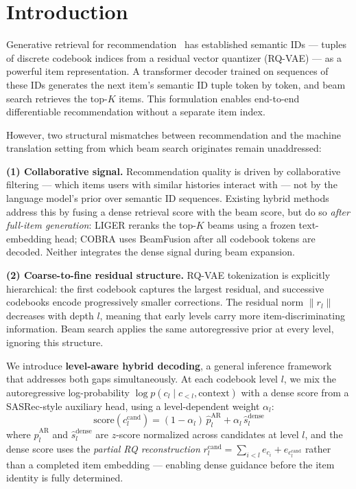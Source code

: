 \section{Introduction}
\label{sec:intro}

Generative retrieval for recommendation~\cite{rajput2023tiger} has established semantic IDs — tuples of discrete codebook indices from a residual vector quantizer (RQ-VAE) — as a powerful item representation. A transformer decoder trained on sequences of these IDs generates the next item's semantic ID tuple token by token, and beam search retrieves the top-$K$ items. This formulation enables end-to-end differentiable recommendation without a separate item index.

However, two structural mismatches between recommendation and the machine translation setting from which beam search originates remain unaddressed:

\textbf{(1) Collaborative signal.} Recommendation quality is driven by collaborative filtering — which items users with similar histories interact with — not by the language model's prior over semantic ID sequences. Existing hybrid methods~\cite{yang2024liger, yang2025cobra} address this by fusing a dense retrieval score with the beam score, but do so \emph{after full-item generation}: LIGER reranks the top-$K$ beams using a frozen text-embedding head; COBRA uses BeamFusion after all codebook tokens are decoded. Neither integrates the dense signal during beam expansion.

\textbf{(2) Coarse-to-fine residual structure.} RQ-VAE tokenization is explicitly hierarchical: the first codebook captures the largest residual, and successive codebooks encode progressively smaller corrections. The residual norm $\|r_l\|$ decreases with depth $l$, meaning that early levels carry more item-discriminating information. Beam search applies the same autoregressive prior at every level, ignoring this structure.

We introduce \textbf{level-aware hybrid decoding}, a general inference framework that addresses both gaps simultaneously. At each codebook level $l$, we mix the autoregressive log-probability $\log p(c_l \mid c_{<l}, \text{context})$ with a dense score from a SASRec-style auxiliary head, using a level-dependent weight $\alpha_l$:
%
\begin{equation}
  \text{score}(c_l^{\text{cand}}) = (1 - \alpha_l)\,\hat{p}_l^{\text{AR}} + \alpha_l\,\hat{s}_l^{\text{dense}}
  \label{eq:mixing}
\end{equation}
%
where $\hat{p}_l^{\text{AR}}$ and $\hat{s}_l^{\text{dense}}$ are $z$-score normalized across candidates at level $l$, and the dense score uses the \emph{partial RQ reconstruction} $r_l^{\text{cand}} = \sum_{i < l} e_{c_i} + e_{c_l^{\text{cand}}}$ rather than a completed item embedding — enabling dense guidance before the item identity is fully determined.

